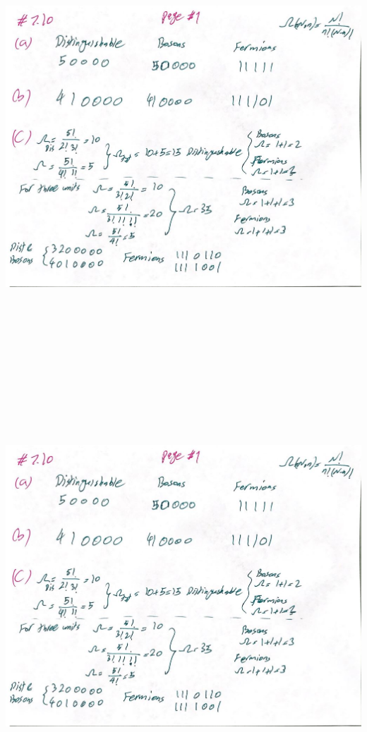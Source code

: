 \documentclass[fleqn]{article}
\begin{document}
\begin{enumerate}
    \begin{center}
      \includegraphics[height=16cm, width=17cm]{710A.JPG}
    \end{center}
    
    \pagebreak

    \begin{center}
      \includegraphics[height=16cm, width=17cm]{710A.JPG}
    \end{center}
    

  \end{enumerate}
\end{document}
